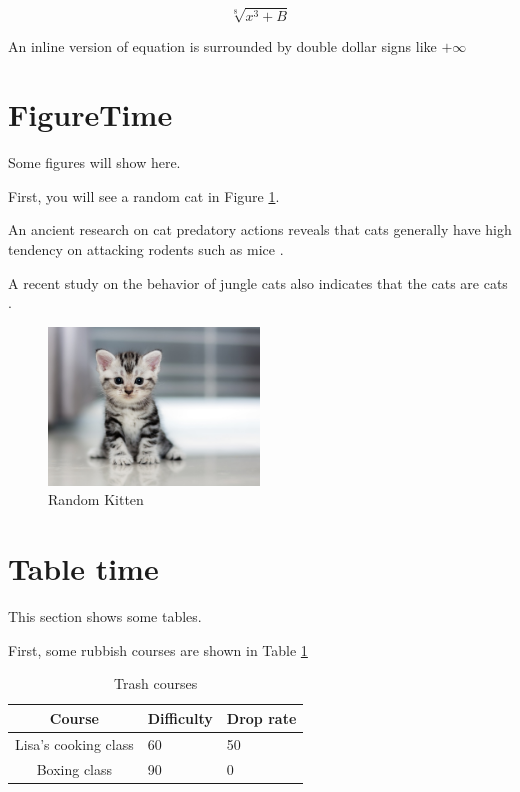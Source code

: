 \documentclass{article}
\begin{document}
\begin{equation}
   \sqrt[8]{x^3 + B}
\end{equation}

An inline version of equation is surrounded by double dollar signs like $+\infty$



\section{FigureTime}

Some figures will show here.

First, you will see a random cat in Figure \ref{fig:randomKit}.

An ancient research on cat predatory actions reveals that cats generally have high tendency on attacking rodents such as mice \cite{reis1973predatory}.

A recent study on the behavior of jungle cats also indicates that the cats are cats \cite{MARINATH2019112651}.


\begin{figure}
    \centering
    \includegraphics[width=0.5\textwidth]{images/kittenrandom.jpg}
    \caption{Random Kitten}
    \label{fig:randomKit}
\end{figure}


\section{Table time}


This section shows some tables.

First, some rubbish courses are shown in Table \ref{table:trashCourses}

\begin{table}[h]
\centering
\caption{Trash courses}
\label{table:trashCourses}
\begin{tabular}{|c|l|l|}
\hline
Course               & \multicolumn{1}{c|}{Difficulty} & \multicolumn{1}{c|}{Drop rate} \\ \hline
Lisa's cooking class & 60                              & 50                             \\ \hline
Boxing class         & 90                              & 0                              \\ \hline
\end{tabular}
\end{table}






\end{document}
